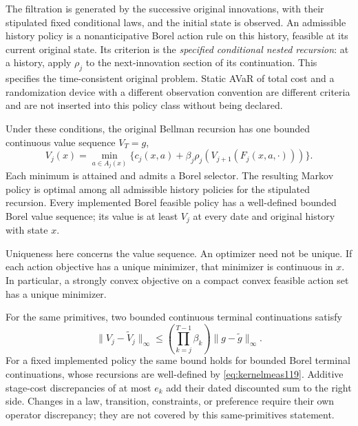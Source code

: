 The filtration is generated by the successive original innovations,
with their stipulated fixed conditional laws, and the initial state is
observed.  An admissible history policy is a nonanticipative Borel action
rule on this history, feasible at its current original state.  Its
criterion is the \emph{specified conditional nested recursion}: at a
history, apply $\rho_j$ to the next-innovation section of its
continuation.  This specifies the time-consistent original problem.
Static AVaR of total cost and a randomization device with a different
observation convention are different criteria and are not inserted into
this policy class without being declared.

\begin{proposition}
\label{prop:finitefoundations119}
Under these conditions, the original Bellman recursion has one bounded
continuous value sequence $V_T=g$,
\[
 V_j(x)=\min_{a\in A_j(x)}
 \{c_j(x,a)+\beta_j\rho_j(V_{j+1}(F_j(x,a,\cdot)))\}.
\]
Each minimum is attained and admits a Borel selector.  The resulting
Markov policy is optimal among all admissible history policies for the
stipulated recursion.  Every implemented Borel feasible policy has a
well-defined bounded Borel value sequence; its value is at least $V_j$
at every date and original history with state $x$.

Uniqueness here concerns the value sequence.  An optimizer need not be
unique.  If each action objective has a unique minimizer, that minimizer
is continuous in $x$.  In particular, a strongly convex objective on
a compact convex feasible action set has a unique minimizer.

For the same primitives, two bounded continuous terminal continuations satisfy
\begin{equation}\label{eq:terminalstability119}
 \|V_j-\widetilde V_j\|_\infty
 \le\left(\prod_{k=j}^{T-1}\beta_k\right)
                  \|g-\widetilde g\|_\infty.
\end{equation}
For a fixed implemented policy the same bound holds for bounded Borel
terminal continuations, whose recursions are well-defined by
\eqref{eq:kernelmeas119}.  Additive
stage-cost discrepancies of at most $e_k$ add their dated discounted
sum to the right side.  Changes in a law, transition, constraints,
or preference require their own operator discrepancy; they are not
covered by this same-primitives statement.
\end{proposition}

